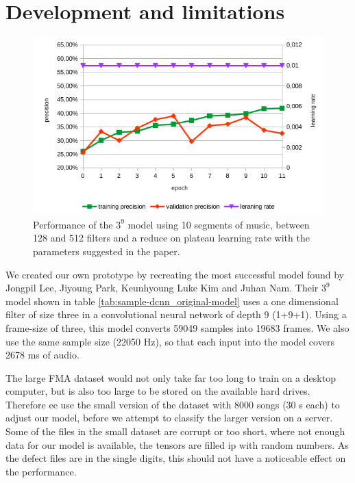 \section{Development and limitations}
\label{sec:development}

\begin{figure}[!htb]
	\centering
	\includegraphics[width=.9\linewidth]{images/sample-dcnn-m3-n9-seg10-128_512-plateau.png}
	\caption{Performance of the $3^9$ model using 10 segments of music, between 128 and 512 filters and a reduce on plateau learning rate with the parameters suggested in the paper.}
	\label{fig:sample-dcnn-m3-n9-seg10-128_512-plateau}
\end{figure}


We created our own prototype by recreating the most successful model found by Jongpil Lee, Jiyoung Park, Keunhyoung Luke Kim and Juhan Nam. Their $3^9$ model shown in table \ref{tab:sample-dcnn_original-model} uses a one dimensional filter of size three in a convolutional neural network of depth 9 (1+9+1).  Using a frame-size of three, this model converts 59049 samples into 19683 frames. We also use the same sample size (22050 Hz), so that each input into the model covers 2678 ms of audio.

The large FMA dataset would not only take far too long to train on a desktop computer, but is also too large to be stored on the available hard drives. Therefore ee use the small version of the dataset with 8000 songs (30 s each) to adjust our model, before we attempt to classify the larger version on a server. Some of the files in the small dataset are corrupt or too short, where not enough data for our model is available, the tensors are filled ip with random numbers. As the defect files are in the single digits, this should not have a noticeable effect on the performance.


